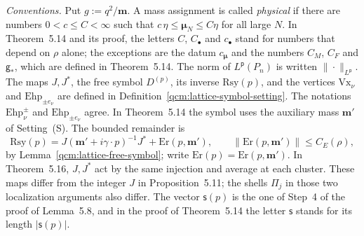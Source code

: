 \documentclass[11pt,letterpaper,reqno]{amsart}
\theoremstyle{definition}
\begin{document}
\emph{Conventions.}
Put $g:=q^2/\mathbf m$.
A mass assignment is called \emph{physical} if there are numbers $0<c\le C<\infty$ such that $c\,\eta\le\boldsymbol\mu_N\le C\eta$ for all large $N$.
In Theorem~5.14 and its proof, the letters $C$, $C_\bullet$ and $c_\bullet$ stand for numbers that depend on $\rho$ alone;
the exceptions are the datum $c_{\boldsymbol\mu}$ and the numbers $C_M$, $C_F$ and $\mathsf g_*$, which are defined in Theorem~5.14.
The norm of $L^{\mathsf p}(P_n)$ is written $\|\cdot\|_{L^{\mathsf p}}$.
The maps $J,J^*$, the free symbol $D^{(p)}$, its inverse
$\mathrm{Rsy}(p)$, and the vertices $\mathrm{Vx}_\nu$ and
$\mathrm{Ehp}_{\pm e_\nu}$ are defined in
Definition~\ref{qcm:lattice-symbol-setting}. The notations
$\mathrm{Ehp}_\nu^\pm$ and $\mathrm{Ehp}_{\pm e_\nu}$ agree.
In Theorem~5.14 the symbol uses the auxiliary mass $\mathbf m'$ of
Setting~(S). The bounded remainder is
\[
 \mathrm{Rsy}(p)=J(\mathbf m'+i\gamma\cdot p)^{-1}J^*
                      +\mathrm{Er}(p,\mathbf m'),\qquad
 \|\mathrm{Er}(p,\mathbf m')\|\le C_E(\rho),
\]
by Lemma~\ref{qcm:lattice-free-symbol}; write
$\mathrm{Er}(p)=\mathrm{Er}(p,\mathbf m')$.
In Theorem~5.16, $J,J^*$ act by the same injection and average at each
cluster. These maps differ from the integer $J$ in Proposition~5.11;
the shells $\Pi_j$ in those two localization arguments also differ.
The vector $\mathsf s(p)$ is the one of Step~4 of the proof of Lemma~5.8, and in the proof of Theorem~5.14 the letter $\mathsf s$ stands for its length $|\mathsf s(p)|$.
\end{document}
